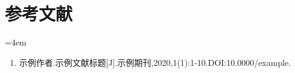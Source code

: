 

\clearpage
\chapter*{参考文献}
\begingroup
\small
\sloppy
\emergencystretch=4em

\begin{enumerate}
	\def\labelenumi{[\arabic{enumi}]}
\item
  \label{bib:1}
  示例作者.示例文献标题{[}J{]}.示例期刊,2020,1(1):1-10.DOI:10.0000/example.
\end{enumerate}
\endgroup
